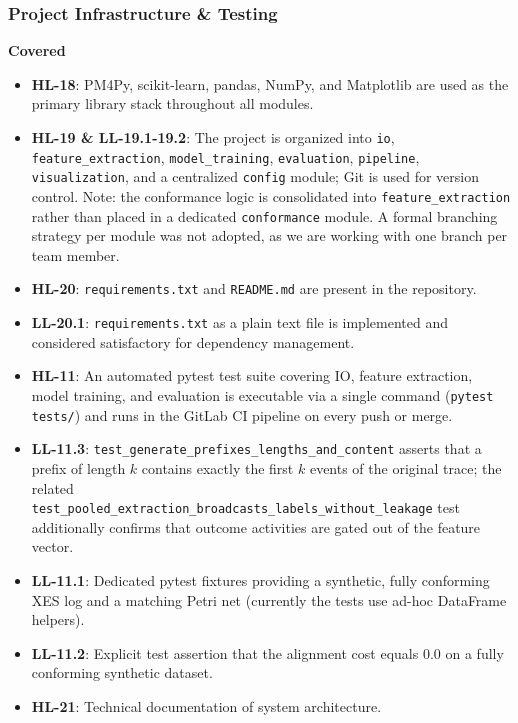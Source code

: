 \documentclass[12pt,a4paper]{article}
\begin{document}
\subsubsection{Project Infrastructure \& Testing}
\textbf{Covered}
\begin{itemize}
    \item \textbf{HL-18}: PM4Py, scikit-learn, pandas, NumPy, and Matplotlib are used as the primary library stack throughout all modules.
    \item \textbf{HL-19 \& LL-19.1-19.2}: The project is organized into \texttt{io}, \texttt{feature\_extraction}, \texttt{model\_training}, \texttt{evaluation}, \texttt{pipeline}, \texttt{visualization}, and a centralized \texttt{config} module; Git is used for version control. Note: the conformance logic is consolidated into \texttt{feature\_extraction} rather than placed in a dedicated \texttt{conformance} module. A formal branching strategy per module was not adopted, as we are working with one branch per team member.
    \item \textbf{HL-20}: \texttt{requirements.txt} and \texttt{README.md} are present in the repository.
    \item \textbf{LL-20.1}: \texttt{requirements.txt} as a plain text file is implemented and considered satisfactory for dependency management.
    \item \textbf{HL-11}: An automated pytest test suite covering IO, feature extraction, model training, and evaluation is executable via a single command (\texttt{pytest tests/}) and runs in the GitLab CI pipeline on every push or merge.
    \item \textbf{LL-11.3}: \texttt{test\_generate\_prefixes\_lengths\_and\_content} asserts that a prefix of length $k$ contains exactly the first $k$ events of the original trace; the related \\\texttt{test\_pooled\_extraction\_broadcasts\_labels\_without\_leakage} test additionally confirms that outcome activities are gated out of the feature vector.
    \item \textbf{LL-11.1}: Dedicated pytest fixtures providing a synthetic, fully conforming XES log and a matching Petri net (currently the tests use ad-hoc DataFrame helpers).
    \item \textbf{LL-11.2}: Explicit test assertion that the alignment cost equals $0.0$ on a fully conforming synthetic dataset.
    \item \textbf{HL-21}: Technical documentation of system architecture.
\end{itemize}
\end{document}
